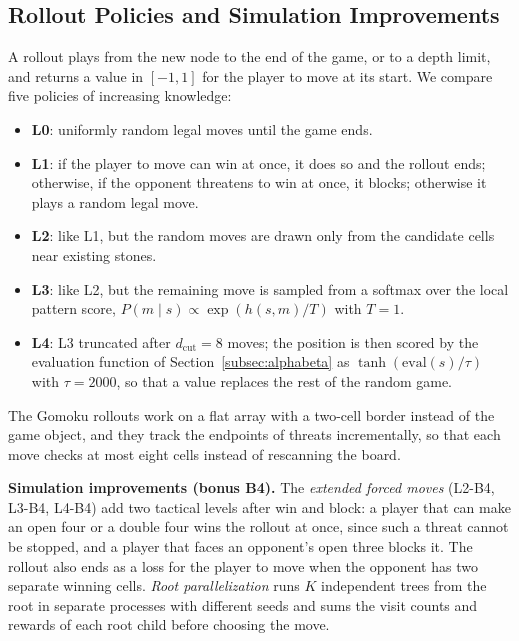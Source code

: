 \subsection{Rollout Policies and Simulation Improvements}
\label{subsec:rollouts}

A rollout plays from the new node to the end of the game, or to a depth limit, and returns a value in $[-1, 1]$ for the player to move at its start. We compare five policies of increasing knowledge:
\begin{itemize}
    \item \textbf{L0}: uniformly random legal moves until the game ends.
    \item \textbf{L1}: if the player to move can win at once, it does so and the rollout ends; otherwise, if the opponent threatens to win at once, it blocks; otherwise it plays a random legal move.
    \item \textbf{L2}: like L1, but the random moves are drawn only from the candidate cells near existing stones.
    \item \textbf{L3}: like L2, but the remaining move is sampled from a softmax over the local pattern score, $P(m \mid s) \propto \exp(h(s,m)/T)$ with $T = 1$.
    \item \textbf{L4}: L3 truncated after $d_{\mathrm{cut}} = 8$ moves; the position is then scored by the evaluation function of Section~\ref{subsec:alphabeta} as $\tanh(\mathrm{eval}(s)/\tau)$ with $\tau = 2000$, so that a value replaces the rest of the random game.
\end{itemize}
The Gomoku rollouts work on a flat array with a two-cell border instead of the game object, and they track the endpoints of threats incrementally, so that each move checks at most eight cells instead of rescanning the board.

\textbf{Simulation improvements (bonus B4).} The \emph{extended forced moves} (L2-B4, L3-B4, L4-B4) add two tactical levels after win and block: a player that can make an open four or a double four wins the rollout at once, since such a threat cannot be stopped, and a player that faces an opponent's open three blocks it. The rollout also ends as a loss for the player to move when the opponent has two separate winning cells. \emph{Root parallelization} runs $K$ independent trees from the root in separate processes with different seeds and sums the visit counts and rewards of each root child before choosing the move.
